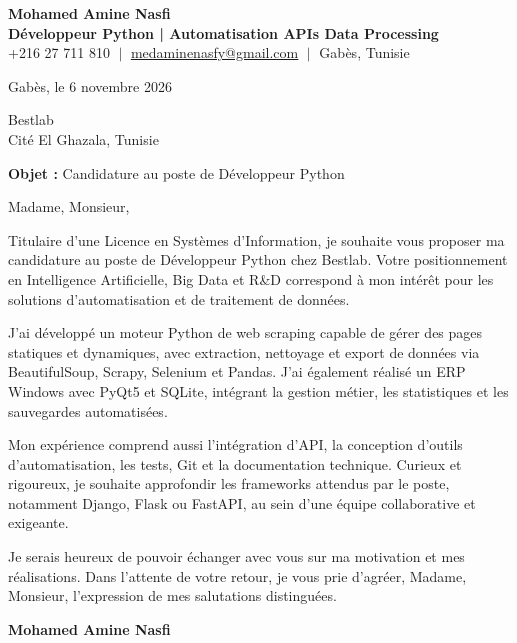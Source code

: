 \documentclass[11pt,a4paper]{article}
\begin{document}
\begin{center}
    \textbf{\Huge \color{navy} Mohamed Amine Nasfi} \\[3pt]
    \small \textbf{\color{accent} Développeur Python | Automatisation \textperiodcentered{} APIs \textperiodcentered{} Data Processing} \\[3pt]
    \footnotesize \color{greytext}
    +216 27 711 810 $\;|\;$
    \href{mailto:medaminenasfy@gmail.com}{\underline{medaminenasfy@gmail.com}} $\;|\;$
    Gabès, Tunisie
\end{center}

\vspace{8pt}
\hfill Gabès, le 6 novembre 2026

\vspace{12pt}
Bestlab \\ Cité El Ghazala, Tunisie

\vspace{10pt}
\textbf{Objet :} Candidature au poste de Développeur Python

\vspace{4pt}
Madame, Monsieur,

Titulaire d'une Licence en Systèmes d'Information, je souhaite vous proposer ma candidature au poste de Développeur Python chez Bestlab. Votre positionnement en Intelligence Artificielle, Big Data et R\&D correspond à mon intérêt pour les solutions d'automatisation et de traitement de données.

J'ai développé un moteur Python de web scraping capable de gérer des pages statiques et dynamiques, avec extraction, nettoyage et export de données via BeautifulSoup, Scrapy, Selenium et Pandas. J'ai également réalisé un ERP Windows avec PyQt5 et SQLite, intégrant la gestion métier, les statistiques et les sauvegardes automatisées.

Mon expérience comprend aussi l'intégration d'API, la conception d'outils d'automatisation, les tests, Git et la documentation technique. Curieux et rigoureux, je souhaite approfondir les frameworks attendus par le poste, notamment Django, Flask ou FastAPI, au sein d'une équipe collaborative et exigeante.

Je serais heureux de pouvoir échanger avec vous sur ma motivation et mes réalisations. Dans l'attente de votre retour, je vous prie d'agréer, Madame, Monsieur, l'expression de mes salutations distinguées.



\vspace{14pt}
\hfill \textbf{Mohamed Amine Nasfi}
\end{document}
